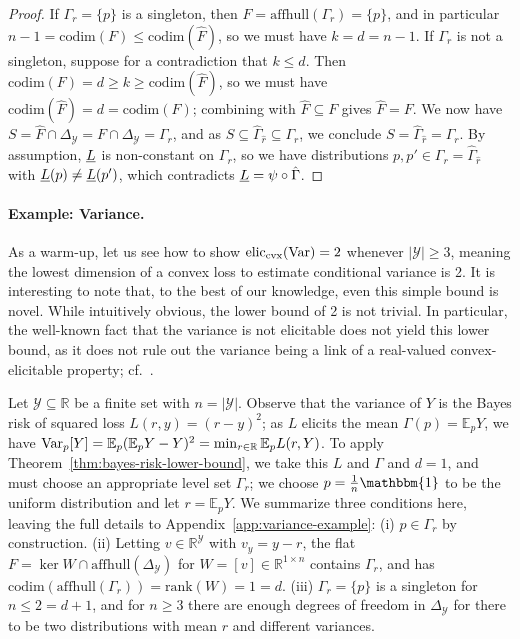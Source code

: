 \documentclass{article}
\newcommand{\reals}{\mathbb{R}}
\newcommand{\simplex}{\Delta_\Y}
\newcommand{\eliccvx}{\mathrm{elic}_\mathrm{cvx}}
\newcommand{\codim}{\mathrm{codim}}
\newcommand{\rank}{\mathrm{rank}}
\newcommand{\affhull}{\mathrm{affhull}}
\newcommand{\E}{\mathbb{E}}
\newcommand{\Y}{\mathcal{Y}}
\newcommand{\ones}{\mathbbm{1}}
\begin{document}
\begin{proof}
  If $\Gamma_r = \{p\}$ is a singleton, then $F = \affhull(\Gamma_r) = \{p\}$, and in particular $n-1 = \codim(F) \leq \codim(\hat F)$, so we must have $k=d=n-1$.
  If $\Gamma_r$ is not a singleton, suppose for a contradiction that $k\leq d$.
  Then $\codim(F) = d \geq k \geq \codim(\hat F)$, so we must have $\codim(\hat F)=d=\codim(F)$; combining with $\hat F \subseteq F$ gives $\hat F = F$.
  We now have $S = \hat F \cap \simplex = F \cap \simplex = \Gamma_r$, and as $S \subseteq \hat\Gamma_{\hat r} \subseteq \Gamma_r$, we conclude $S = \hat\Gamma_{\hat r} = \Gamma_r$.
  By assumption, $\underline{L}$ is non-constant on $\Gamma_r$, so we have distributions $p,p' \in \Gamma_r = \hat\Gamma_{\hat r}$ with $\underline{L}(p)\neq\underline{L}(p')$, which contradicts $\underline{L} = \psi \circ \hat\Gamma$.
\end{proof}


\paragraph{Example: Variance.}
As a warm-up, let us see how to show $\eliccvx(\Var)=2$ whenever $|\Y|\geq 3$, meaning the lowest dimension of a convex loss to estimate conditional variance is 2.
It is interesting to note that, to the best of our knowledge, even this simple bound is novel.
While intuitively obvious, the lower bound of 2 is not trivial.
In particular, the well-known fact that the variance is not elicitable does not yield this lower bound, as it does not rule out the variance being a link of a real-valued convex-elicitable property; cf.~\citet{frongillo2018elicitation}.

Let $\Y\subseteq\reals$ be a finite set with $n=|\Y|$.
Observe that the variance of $Y$ is the Bayes risk of squared loss $L(r,y) = (r-y)^2$; as $L$ elicits the mean $\Gamma(p) = \E_p Y$, we have $\Var_p[Y] = \E_p (\E_pY - Y)^2 = \min_{r\in\reals} \E_p L(r,Y)$.
To apply Theorem~\ref{thm:bayes-risk-lower-bound}, we take this $L$ and $\Gamma$ and $d=1$, and must choose an appropriate level set $\Gamma_r$; we choose $p = \tfrac 1 n \ones$ to be the uniform distribution and let $r=\E_pY$.
We summarize three conditions here, leaving the full details to Appendix~\ref{app:variance-example}:
(i) $p\in\Gamma_r$ by construction.
(ii) Letting $v\in\reals^\Y$ with $v_y = y - r$, the flat $F = \ker W \cap \affhull(\simplex)$ for $W = [v]\in\reals^{1\times n}$ contains $\Gamma_r$, and has $\codim(\affhull(\Gamma_r)) = \rank(W) = 1 = d$.
(iii)
$\Gamma_r=\{p\}$ is a singleton for $n \leq 2 = d+1$, and for $n\geq 3$ there are enough degrees of freedom in $\simplex$ for there to be two distributions with mean $r$ and different variances.
\end{document}
